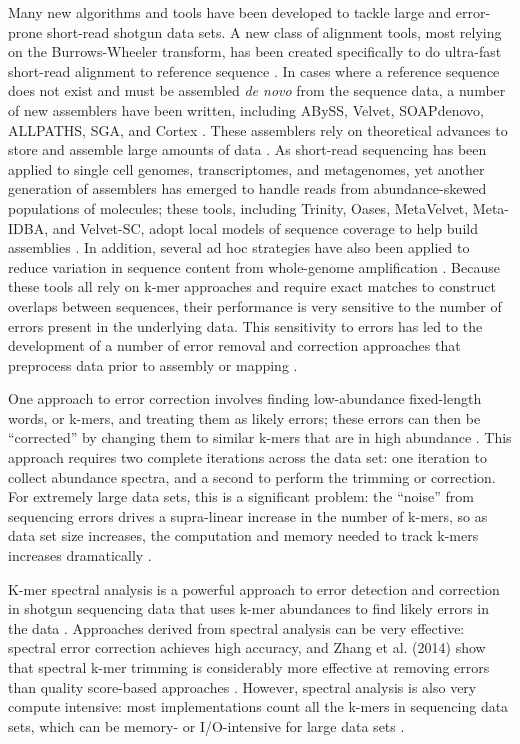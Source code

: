 Many new algorithms and tools have been developed to tackle large and
error-prone short-read shotgun data sets. A new class of alignment tools, most
relying on the Burrows-Wheeler transform, has been created specifically to do
ultra-fast short-read alignment to reference sequence \cite{pubmed19430453}. 
In cases where a reference sequence does not exist and must be assembled {\em
de novo} from the sequence data, a number of new assemblers have been written,
including ABySS, Velvet, SOAPdenovo, ALLPATHS, SGA, and Cortex
\cite{pubmed19251739,pubmed18349386,pubmed20511140,pubmed21187386,
pubmed22156294,cortex}. These assemblers rely on theoretical advances to store
and assemble large amounts of data \cite{pubmed22068540,pubmed20529929}.  As
short-read sequencing has been applied to single cell genomes, transcriptomes,
and metagenomes, yet another generation of assemblers has emerged to handle
reads from abundance-skewed populations of molecules; these tools, including
Trinity, Oases, MetaVelvet, Meta-IDBA, and Velvet-SC, adopt local models of
sequence coverage to help build assemblies
\cite{pubmed21572440,pubmed22368243,metavelvet,pubmed21685107,pubmed21926975}.
In addition, several ad hoc strategies have also been applied to reduce
variation in sequence content from whole-genome amplification
\cite{pubmed19724646,pubmed22028825}. Because these tools all rely on k-mer
approaches and require exact matches to construct overlaps between sequences,
their performance is very sensitive to the number of errors present in the
underlying data. This sensitivity to errors has led to the development of a
number of error removal and correction approaches that preprocess data prior to
assembly or mapping \cite{pubmed21685062,pubmed15059830,Kelley2010}.

One approach to error correction involves finding low-abundance fixed-length
words, or k-mers, and treating them as likely errors; these errors can then be
``corrected'' by changing them to similar k-mers that are in high abundance
\cite{pubmed21114842}.  This approach requires two complete iterations across
the data set: one iteration to collect abundance spectra, and a second to
perform the trimming or correction.  For extremely large data sets, this is a
significant problem: the ``noise'' from sequencing errors drives a supra-linear
increase in the number of k-mers, so as data set size increases, the
computation and memory needed to track k-mers increases dramatically
\cite{pubmed21245053}.


K-mer spectral analysis is a powerful approach to error detection and
correction in shotgun sequencing data that uses k-mer abundances to find likely
errors in the data \cite{Pevzner2001}.  Approaches derived from spectral
analysis can be very effective: spectral error correction achieves high
accuracy, and Zhang et al. (2014) show that spectral k-mer trimming is
considerably more effective at removing errors than quality score-based
approaches \cite{quake,Zhang2014}.  However, spectral analysis is also very
compute intensive: most implementations count all the k-mers in sequencing data
sets, which can be memory- or I/O-intensive for large data sets
\cite{Zhang2014}.


